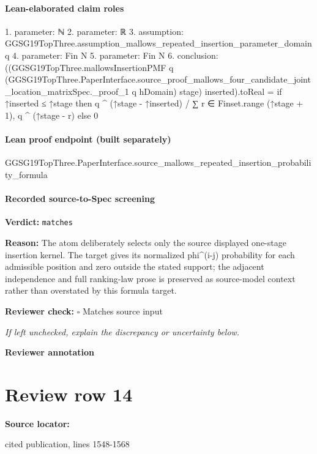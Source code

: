 \documentclass[10pt]{article}
\newcommand{\reviewerbox}{%
  \par\noindent\fbox{\parbox{0.96\linewidth}{\rule{0pt}{0.38in}}}\par
}
\newcommand{\reviewmatch}[1]{%
  \par\noindent\textbf{Reviewer check:} $\square$\; #1\par
  \noindent\emph{If left unchecked, explain the discrepancy or uncertainty below.}\par
}
\begin{document}
\paragraph{Lean-elaborated claim roles}\begin{ReviewVerbatim}
1. parameter: ℕ
2. parameter: ℝ
3. assumption: GGSG19TopThree.assumption_mallows_repeated_insertion_parameter_domain q
4. parameter: Fin N
5. parameter: Fin N
6. conclusion: ((GGSG19TopThree.mallowsInsertionPMF q
        (GGSG19TopThree.PaperInterface.source_proof_mallows_four_candidate_joint_location_matrixSpec._proof_1 q hDomain)
        stage)
      inserted).toReal =
  if ↑inserted ≤ ↑stage then q ^ (↑stage - ↑inserted) / ∑ r ∈ Finset.range (↑stage + 1), q ^ (↑stage - r) else 0
\end{ReviewVerbatim}

\paragraph{Lean proof endpoint (built separately)}\begin{ReviewVerbatim}
GGSG19TopThree.PaperInterface.source_mallows_repeated_insertion_probability_formula
\end{ReviewVerbatim}

\paragraph{Recorded source-to-Spec screening}
\textbf{Verdict:} \texttt{matches}
\\
{\raggedright
\textbf{Reason:} The atom deliberately selects only the source displayed one-\allowbreak{}stage insertion kernel.\allowbreak{} The target gives its normalized phi\textasciicircum{}(i-\allowbreak{}j) probability for each admissible position and zero outside the stated support;\allowbreak{} the adjacent independence and full ranking-\allowbreak{}law prose is preserved as source-\allowbreak{}model context rather than overstated by this formula target.\allowbreak{}
\par}
\reviewmatch{Matches source input}
\noindent\textbf{Reviewer annotation}\par
\reviewerbox
\clearpage
\hypertarget{source-claim-b4c9d86dce53081b}{}
\section*{Review row 14}
\textbf{Source locator:} {\footnotesize\raggedright cited publication, lines 1548-\allowbreak{}1568\par}
\end{document}
